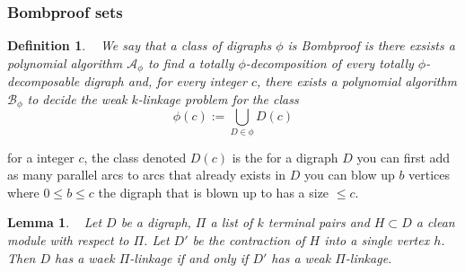 \documentclass{beamer}
\newtheorem{lemma}[thm]{Lemma}
\newtheorem{definition}{Definition}[section]
\begin{document}
\begin{frame}
\frametitle{Bombproof sets}
\begin{definition}~\cite{bangJGT85}
    We say that a class of digraphs $\phi$ is Bombproof is there exsists a polynomial algorithm $\mathcal{A}_\phi$ to find a totally $\phi$-decomposition of every totally $\phi$-decomposable digraph and, for every integer $c$, there exists a polynomial algorithm  $\mathcal{B}_\phi$ to decide the weak $k$-linkage problem for the class
    \begin{equation}
        \phi(c):=\bigcup_{D\in \phi}D(c) 
    \end{equation}
\end{definition}
for a integer $c$, the class denoted $D(c)$ is the for a digraph $D$ you can first add as many parallel arcs to arcs that already exists in $D$ you can blow up $b$ vertices where $0\leq b\leq c$ the digraph that is blown up to has a size $\leq c$. 
\end{frame}

\begin{frame}
    \begin{lemma}~\cite{bangJGT85}
        Let $D$ be a digraph, $\Pi$ a list of $k$ terminal pairs and $H\subset D$ a clean module with respect to $\Pi$. Let $D'$ be the contraction of $H$ into a single vertex $h$. Then $D$ has a waek $\Pi$-linkage if and only if $D'$ has a weak $\Pi$-linkage.  
    \end{lemma}
\end{frame}
\end{document}
